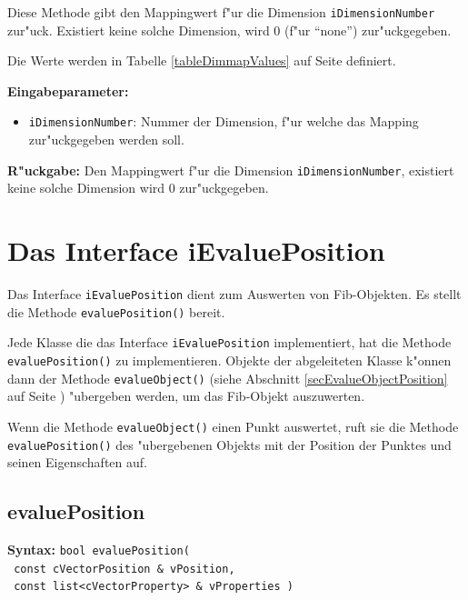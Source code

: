 \bigskip\noindent
Diese Methode gibt den Mappingwert f"ur die Dimension \verb|iDimensionNumber| zur"uck. Existiert keine solche Dimension, wird $0$ (f"ur ``none'') zur"uckgegeben.

Die Werte werden in Tabelle \ref{tableDimmapValues} auf Seite \pageref{tableDimmapValues} definiert.

\bigskip\noindent
\textbf{Eingabeparameter:}
\begin{itemize}
 \item \verb|iDimensionNumber|: Nummer der Dimension, f"ur welche das Mapping zur"uckgegeben werden soll.
\end{itemize}

\bigskip\noindent
\textbf{R"uckgabe:} Den Mappingwert f"ur die Dimension \verb|iDimensionNumber|, existiert keine solche Dimension wird $0$ zur"uckgegeben.



\section{Das Interface iEvaluePosition}
\label{secIEvaluePosition}

Das Interface \verb|iEvaluePosition| dient zum Auswerten von Fib-Objekten. Es stellt die Methode \verb|evaluePosition()| bereit.

Jede Klasse die das Interface \verb|iEvaluePosition| implementiert, hat die Methode \verb|evaluePosition()| zu implementieren. Objekte der abgeleiteten Klasse k"onnen dann der Methode \verb|evalueObject()| (siehe Abschnitt \ref{secEvalueObjectPosition} auf Seite \pageref{secEvalueObjectPosition}) "ubergeben werden, um das Fib-Objekt auszuwerten.

Wenn die Methode \verb|evalueObject()| einen Punkt auswertet, ruft sie die Methode \verb|evaluePosition()| des "ubergebenen Objekts mit der Position der Punktes und seinen Eigenschaften auf.


\subsection{evaluePosition}

\textbf{Syntax:} \verb|bool evaluePosition(| \\\verb| const cVectorPosition & vPosition,| \\\verb| const list<cVectorProperty> & vProperties )|

